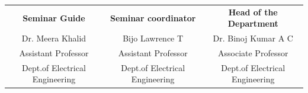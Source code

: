 \documentclass[12pt,a4paper]{report}
\begin{document}
\begin{center}

   

 

\begin{tabular}{ c c c }

\centering

\hspace*{-1.5cm}

\vspace{0.5cm}

\textbf{Seminar Guide } & \textbf{Seminar coordinator} & \textbf{Head of the Department } \\

 

   

\hspace*{-1.5cm}

Dr. Meera Khalid & Bijo Lawrence T & Dr. Binoj Kumar A C \\

\hspace*{-1.5cm}

 Assistant Professor & Assistant Professor & Associate Professor \\

\hspace*{-1.5cm}

Dept.of Electrical  Engineering  & Dept.of Electrical  Engineering  & Dept.of Electrical  Engineering \\ 

\end{tabular}

\end{center}

\thispagestyle{empty}

 


 

 

\fancyfoot{} %

\fancyfoot[LE,RO]{\thepage}




 

\newpage
\end{document}
